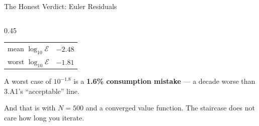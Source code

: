 \begin{frame}{The Honest Verdict: Euler Residuals}
\begin{columns}[c]
\begin{column}{0.45\textwidth}
\medskip
\begin{center}\footnotesize
\begin{tabular}{@{}lr@{}}
\toprule
mean $\log_{10}\mathcal{E}$ & $-2.48$ \\
worst $\log_{10}\mathcal{E}$ & $-1.81$ \\
\bottomrule
\end{tabular}
\end{center}
\medskip
A worst case of $10^{-1.8}$ is a \textbf{1.6\% consumption mistake} --- a decade worse than 3.A1's ``acceptable'' line.
\medskip
\begin{cautionbox}\footnotesize
And that is with $N=500$ and a converged value function. The staircase does not care how long you iterate.
\end{cautionbox}
\end{column}
\end{columns}
\end{frame}


